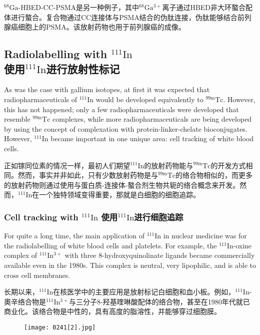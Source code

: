 \documentclass[dvipsnames, svgnames,a4paper,11pt]{article}
\begin{document}
\(\mathrm{^{68}Ga}\)-HBED-CC-PSMA是另一种例子，其中\(\mathrm{^{68}Ga^{3+}}\)离子通过HBED非大环螯合配体进行螯合。复合物通过CC连接体与PSMA结合的伪肽连接，伪肽能够结合前列腺癌细胞上的PSMA。该放射药物也用于前列腺癌的成像。

\subsection{Radiolabelling with \(\mathrm{^{111}In}\)\\ 使用\(\mathrm{^{111}In}\)进行放射性标记}  

As was the case with gallium isotopes, at first it was expected that radiopharmaceuticals of \(\mathrm{^{111}In}\) would be developed equivalently to \(\mathrm{^{99m}Tc}\). However, this has not happened; only a few radiopharmaceuticals were developed that resemble \(\mathrm{^{99m}Tc}\) complexes, while more radiopharmaceuticals are being developed by using the concept of complexation with protein-linker-chelate bioconjugates. However, \(\mathrm{^{111}In}\) became important in one unique area: cell tracking of white blood cells.

正如镓同位素的情况一样，最初人们期望\(\mathrm{^{111}In}\)的放射药物能与\(\mathrm{^{99m}Tc}\)的开发方式相同。然而，事实并非如此，只有少数放射药物是与\(\mathrm{^{99m}Tc}\)的络合物相似的，而更多的放射药物则通过使用与蛋白质-连接体-螯合剂生物共轭的络合概念来开发。然而，\(\mathrm{^{111}In}\)在一个独特领域变得重要，那就是白细胞的细胞追踪。

\subsubsection{Cell tracking with \(\mathrm{^{111}In}\) 使用\(\mathrm{^{111}In}\)进行细胞追踪}  

For quite a long time, the main application of \(\mathrm{^{111}In}\) in nuclear medicine was for the radiolabelling of white blood cells and platelets. For example, the \(\mathrm{^{111}In}\)-oxine complex of \(\mathrm{^{111}In^{3+}}\) with three 8-hydroxyquinolinate ligands became commercially available even in the 1980s. This complex is neutral, very lipophilic, and is able to cross cell membranes.

长期以来，\(\mathrm{^{111}In}\)在核医学中的主要应用是放射标记白细胞和血小板。例如，\(\mathrm{^{111}In}\)-奧辛络合物是\(\mathrm{^{111}In^{3+}}\)与三分子8-羟基喹啉酸配体的络合物，甚至在1980年代就已商业化。该络合物是中性的，具有高度的脂溶性，并能够穿过细胞膜。

\begin{figure}[h]
	\centering
    \texttt{[image: 0241[2].jpg]}  
     \label{fig322}
\end{figure}
\end{document}
